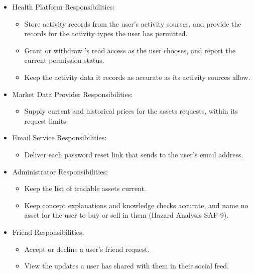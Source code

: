 \documentclass[12pt]{article}
\begin{document}
\begin{itemize}
\begin{itemize}
\item Send the email service no personal or health data other than the user's
  email address and their password reset link (Hazard Analysis SEC-11).
\end{itemize}
\item Health Platform Responsibilities:
\begin{itemize}
\item Store activity records from the user's activity sources, and provide
  the records for the activity types the user has permitted.
\item Grant or withdraw \progname{}'s read access as the user chooses, and
  report the current permission status.
\item Keep the activity data it records as accurate as its activity sources
  allow.
\end{itemize}
\item Market Data Provider Responsibilities:
\begin{itemize}
\item Supply current and historical prices for the assets \progname{}
  requests, within its request limits.
\end{itemize}
\item Email Service Responsibilities:
\begin{itemize}
\item Deliver each password reset link that \progname{} sends to the user's
  email address.
\end{itemize}
\item Administrator Responsibilities:
\begin{itemize}
\item Keep the list of tradable assets current.
\item Keep concept explanations and knowledge checks accurate, and name no
  asset for the user to buy or sell in them (Hazard Analysis SAF-9).
\end{itemize}
\item Friend Responsibilities:
\begin{itemize}
\item Accept or decline a user's friend request.
\item View the updates a user has shared with them in their social feed.
\end{itemize}
\end{itemize}

\end{document}
